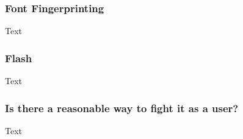 \subsubsection{Font Fingerprinting}

Text

\subsubsection{Flash}

Text

\subsubsection{Is there a reasonable way to fight it as a user?}

Text

